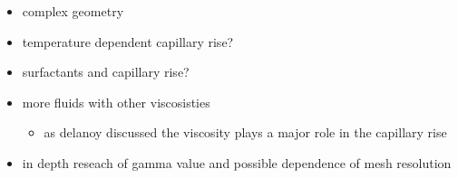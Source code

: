\begin{itemize}
    \item complex geometry
    \item temperature dependent capillary rise?
    \item surfactants and capillary rise?
    \item more fluids with other viscosisties
    \begin{itemize}
        \item as delanoy discussed the viscosity plays a major role in the capillary rise
    \end{itemize}
    \item in depth reseach of gamma value and possible dependence of mesh resolution
\end{itemize}